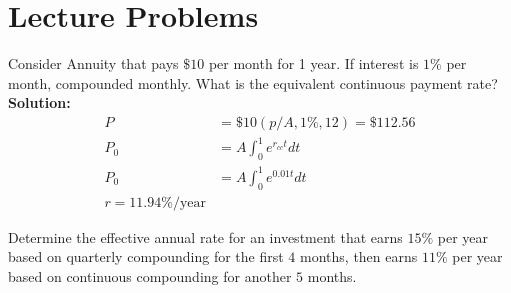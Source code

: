 \chapter{Lecture Problems}

\begin{Problem}
    Consider Annuity that pays $\$10$ per month for 1 year. If interest is $1\%$ per month, compounded monthly. What is the equivalent continuous payment rate? \\
    \textbf{Solution:}
    \begin{align}
        P   & = \$10 (p/A, 1\%, 12) = \$112.56 \\
        P_0 & = A\int_0^1 e^{r_{cc}t} dt       \\
        P_0 & = A\int_0^1 e^{0.01t} dt         \\
        r = 11.94\% / \text{year}
    \end{align}
\end{Problem}

\begin{problem}
Determine the effective annual rate for an investment that earns $15\%$ per year based on
quarterly compounding for the first $4$ months, then earns $11\%$ per year based on continuous
compounding for another $5$ months.
\end{problem}